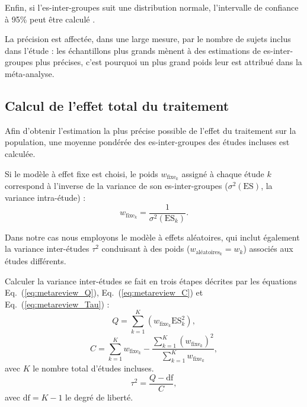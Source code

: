 Enfin, si l'\gls{es}-inter-groupes suit une distribution normale, l'intervalle de confiance à 95\% peut être calculé \citep{Borenstein2009}.

La précision est affectée, dans une large mesure, par le nombre de sujets inclus dans l'étude : les échantillons plus grands mènent à des
estimations de \gls{es}-inter-groupes plus précises, c'est pourquoi un plus grand poids leur est attribué dans la méta-analyse.

\subsection{Calcul de l'effet total du traitement}

Afin d'obtenir l'estimation la plus précise possible de l'effet du traitement sur la population, une moyenne pondérée des \gls{es}-inter-groupes 
des études incluses est calculée.

Si le modèle à effet fixe est choisi, le poids $w_{\text{fixe}_k}$ assigné à chaque étude $k$ correspond à l'inverse de la variance de son 
\gls{es}-inter-groupes ($\sigma^2(\text{ES})$, la variance intra-étude) \citep{Borenstein2009} :
\begin{equation}
\label{eq:metareview_weight_fixed_study}
w_{\text{fixe}_k} = \frac{1}{\sigma^2(\text{ES}_k)}.
\end{equation} 

Dans notre cas nous employons le modèle à effets aléatoires, qui inclut également la variance inter-études $\tau^2$ conduisant à des 
poids ($w_{\text{aléatoires}_k} = w_k$) associés aux études différents.

Calculer la variance inter-études se fait en trois étapes décrites par les équations Eq.~(\ref{eq:metareview_Q}), Eq.~(\ref{eq:metareview_C}) 
et Eq.~(\ref{eq:metareview_Tau}) \citep{Borenstein2009} :
\begin{equation}
\label{eq:metareview_Q}
Q = \sum_{k=1}^{K} (w_{\text{fixe}_k} \text{ES}_k^2),
\end{equation}
\begin{equation}
\label{eq:metareview_C}
C = \sum_{k=1}^{K} w_{\text{fixe}_k} - \frac{ \sum_{k=1}^{K} (w_{\text{fixe}_k})^2 } { \sum_{k=1}^{K} w_{\text{fixe}_k} },
\end{equation}
avec $K$ le nombre total d'études incluses.
\begin{equation}
\label{eq:metareview_Tau}
\tau^2 = \frac{Q - \text{df}}{C},
\end{equation}
avec $\text{df} = K - 1$ le degré de liberté.

